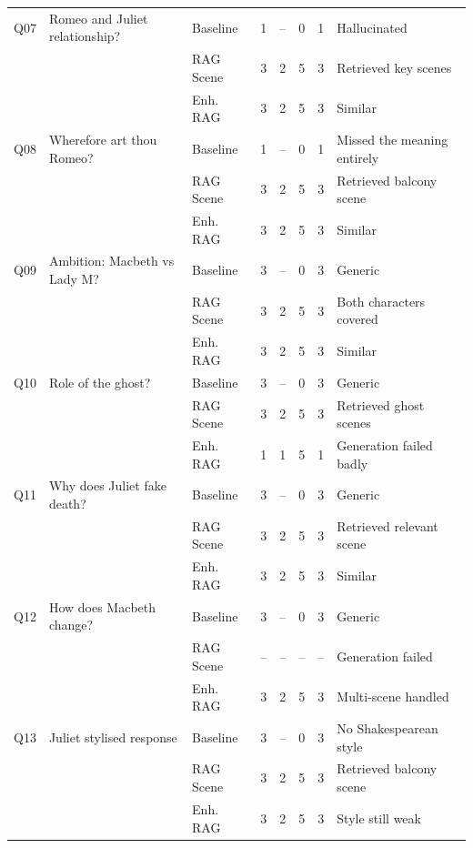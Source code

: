 \documentclass[10pt,conference]{IEEEtran}
\begin{document}
\begin{table}[p]
\begin{tabularx}{\textwidth}{p{0.6cm} p{4cm} p{2.2cm} p{1cm} p{1cm} p{1cm} p{1cm} X}
\midrule
Q07 & Romeo and Juliet relationship? & Baseline & 1 & -- & 0 & 1 & Hallucinated \\
    &                                & RAG Scene & 3 & 2 & 5 & 3 & Retrieved key scenes \\
    &                                & Enh. RAG  & 3 & 2 & 5 & 3 & Similar \\
\midrule
Q08 & Wherefore art thou Romeo? & Baseline & 1 & -- & 0 & 1 & Missed the meaning entirely \\
    &                           & RAG Scene & 3 & 2 & 5 & 3 & Retrieved balcony scene \\
    &                           & Enh. RAG  & 3 & 2 & 5 & 3 & Similar \\
\midrule
Q09 & Ambition: Macbeth vs Lady M? & Baseline & 3 & -- & 0 & 3 & Generic \\
    &                              & RAG Scene & 3 & 2 & 5 & 3 & Both characters covered \\
    &                              & Enh. RAG  & 3 & 2 & 5 & 3 & Similar \\
\midrule
Q10 & Role of the ghost? & Baseline & 3 & -- & 0 & 3 & Generic \\
    &                    & RAG Scene & 3 & 2 & 5 & 3 & Retrieved ghost scenes \\
    &                    & Enh. RAG  & 1 & 1 & 5 & 1 & Generation failed badly \\
\midrule
Q11 & Why does Juliet fake death? & Baseline & 3 & -- & 0 & 3 & Generic \\
    &                             & RAG Scene & 3 & 2 & 5 & 3 & Retrieved relevant scene \\
    &                             & Enh. RAG  & 3 & 2 & 5 & 3 & Similar \\
\midrule
Q12 & How does Macbeth change? & Baseline & 3 & -- & 0 & 3 & Generic \\
    &                          & RAG Scene & -- & -- & -- & -- & Generation failed \\
    &                          & Enh. RAG  & 3 & 2 & 5 & 3 & Multi-scene handled \\
\midrule
Q13 & Juliet stylised response & Baseline & 3 & -- & 0 & 3 & No Shakespearean style \\
    &                          & RAG Scene & 3 & 2 & 5 & 3 & Retrieved balcony scene \\
    &                          & Enh. RAG  & 3 & 2 & 5 & 3 & Style still weak \\

\end{tabularx}
\end{table}
\end{document}
